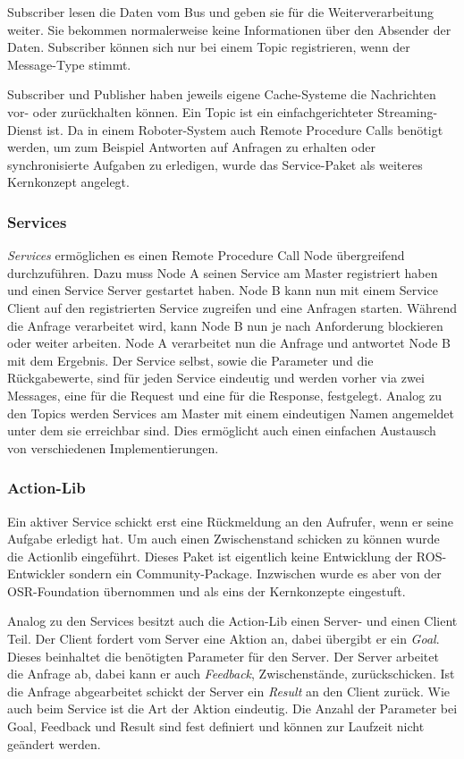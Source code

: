 Subscriber lesen die Daten vom Bus und geben sie für die Weiterverarbeitung weiter. Sie bekommen normalerweise keine Informationen über den Absender der Daten. Subscriber können sich nur bei einem Topic registrieren, wenn der Message-Type stimmt.

Subscriber und Publisher haben jeweils eigene Cache-Systeme die Nachrichten vor- oder zurückhalten können. Ein Topic ist ein einfachgerichteter Streaming-Dienst ist. Da in einem Roboter-System auch Remote Procedure Calls benötigt werden, um zum Beispiel Antworten auf Anfragen zu erhalten oder synchronisierte Aufgaben zu erledigen, wurde das Service-Paket als weiteres Kernkonzept angelegt.

\subsubsection{Services}

\textit{Services} ermöglichen es einen Remote Procedure Call Node übergreifend durchzuführen. Dazu muss Node A seinen Service am Master registriert haben und einen Service Server gestartet haben. Node B kann nun mit einem Service Client auf den registrierten Service zugreifen und eine Anfragen starten. Während die Anfrage verarbeitet wird, kann Node B nun je nach Anforderung blockieren oder weiter arbeiten. Node A verarbeitet nun die Anfrage und antwortet Node B mit dem Ergebnis. Der Service selbst, sowie die Parameter und die Rückgabewerte, sind für jeden Service eindeutig und werden vorher via zwei Messages, eine für die Request und eine für die Response, festgelegt. Analog zu den Topics werden Services am Master mit einem eindeutigen Namen angemeldet unter dem sie erreichbar sind. Dies ermöglicht auch einen einfachen Austausch von verschiedenen Implementierungen.

\subsubsection{Action-Lib}
Ein aktiver Service schickt erst eine Rückmeldung an den Aufrufer, wenn er seine Aufgabe erledigt hat. Um auch einen Zwischenstand schicken zu können wurde die Actionlib eingeführt. Dieses Paket ist eigentlich keine Entwicklung der ROS-Entwickler sondern ein Community-Package. Inzwischen wurde es aber von der OSR-Foundation übernommen und als eins der Kernkonzepte eingestuft.

Analog zu den Services besitzt auch die Action-Lib einen Server- und einen Client Teil. Der Client fordert vom Server eine Aktion an, dabei übergibt er ein \textit{Goal}. Dieses beinhaltet die benötigten Parameter für den Server. Der Server arbeitet die Anfrage ab, dabei kann er auch \textit{Feedback}, Zwischenstände, zurückschicken. Ist die Anfrage abgearbeitet schickt der Server ein \textit{Result} an den Client zurück. Wie auch beim Service ist die Art der Aktion eindeutig. Die Anzahl der Parameter bei Goal, Feedback und Result sind fest definiert und können zur Laufzeit nicht geändert werden.